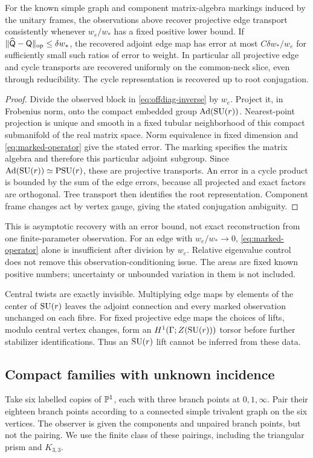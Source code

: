 \begin{theorem}\label{thm:projective-inverse}
For the known simple graph and component
matrix-algebra markings induced by the
unitary frames, the observations above
recover projective edge transport
consistently whenever $w_e/w_*$ has a
fixed positive lower bound.
If
$\|\widehat{\mathsf Q}-\mathsf Q\|_{\mathrm{op}}
\le\delta w_*$, the recovered adjoint
edge map has error at most
$C\delta w_*/w_e$ for sufficiently small
such ratios of error to weight.
In particular all projective edge and
cycle transports are recovered uniformly
on the common-neck slice, even through
reducibility. The cycle representation
is recovered up to root conjugation.
\end{theorem}
\begin{proof}
Divide the observed block in
\eqref{eq:offdiag-inverse} by $w_e$.
Project it, in Frobenius norm, onto the
compact embedded group $\operatorname{Ad}(\operatorname{SU}(r))$.
Nearest-point projection is unique and
smooth in a fixed tubular neighborhood
of this compact submanifold of the
real matrix space. Norm equivalence in
fixed dimension and
\eqref{eq:marked-operator} give the
stated error. The marking specifies
the matrix algebra and therefore this
particular adjoint subgroup.
Since $\operatorname{Ad}(\operatorname{SU}(r))\simeq\operatorname{PSU}(r)$,
these are projective transports.
An error in a cycle product is bounded
by the sum of the edge errors, because
all projected and exact factors are
orthogonal. Tree transport then identifies
the root representation. Component frame
changes act by vertex gauge, giving
the stated conjugation ambiguity.
\end{proof}

This is asymptotic recovery with an error
bound, not exact reconstruction from one
finite-parameter observation.
For an edge with $w_e/w_*\to0$,
\eqref{eq:marked-operator} alone is
insufficient after division by $w_e$.
Relative eigenvalue control does not
remove this observation-conditioning issue.
The areas are fixed known positive
numbers; uncertainty or unbounded
variation in them is not included.

Central twists are exactly invisible.
Multiplying edge maps by elements of
the center of $\operatorname{SU}(r)$ leaves the
adjoint connection and every marked
observation unchanged on each fibre.
For fixed projective edge maps the
choices of lifts, modulo central vertex
changes, form an $H^1(\Gamma;Z(\operatorname{SU}(r)))$
torsor before further stabilizer
identifications. Thus an $\operatorname{SU}(r)$ lift
cannot be inferred from these data.

\subsection{Compact families with unknown incidence}
Take six labelled copies of $\mathbb P^1$,
each with three branch points at
$0,1,\infty$. Pair their eighteen branch
points according to a connected simple
trivalent graph on the six vertices.
The observer is given the components
and unpaired branch points, but not
the pairing. We use the finite class
of these pairings, including the
triangular prism and $K_{3,3}$.

